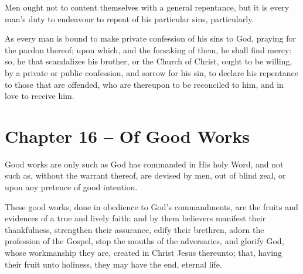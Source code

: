 \begin{outerlst}[left=0pt,labelsep=0pt]
\begin{innerlst}[resume*]
\item Men ought not to content themselves with a general repentance, but it is every man's duty to endeavour to repent of his particular sins, particularly.   

\item As every man is bound to make private confession of his sins to God, praying for the pardon thereof; upon which, and the forsaking of them, he shall find mercy: so, he that scandalizes his brother, or the Church of Christ, ought to be willing, by a private or public confession, and sorrow for his sin, to declare his repentance to those that are offended, who are thereupon to be reconciled to him, and in love to receive him.  
\end{innerlst}

\item
{}
\section{Chapter 16 -- Of Good Works}
\begin{innerlst}[resume*]

\item Good works are only such as God has commanded in His holy Word, and not such as, without the warrant thereof, are devised by men, out of blind zeal, or upon any pretence of good intention.    

\item These good works, done in obedience to God's commandments, are the fruits and evidences of a true and lively faith: and by them believers manifest their thankfulness, strengthen their assurance, edify their brethren, adorn the profession of the Gospel, stop the mouths of the adversaries, and glorify God, whose workmanship they are, created in Christ Jesus thereunto; that, having their fruit unto holiness, they may have the end, eternal life.   


\end{innerlst}
\end{outerlst}
